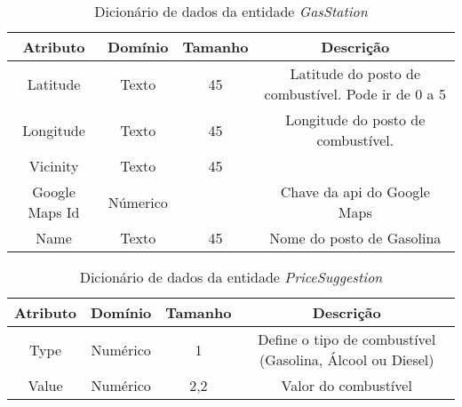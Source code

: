 \begin{table}[]
\centering
\caption{Dicionário de dados da entidade \textit{GasStation}}
\label{my-label}
\begin{tabular}{cccc}
\toprule
\textbf{Atributo} & \textbf{Domínio} & \textbf{Tamanho} & \textbf{Descrição} \\
\midrule
Latitude                        & Texto                          & 45                             & Latitude do posto de combustível. Pode ir de 0 a 5                 \\
Longitude                       & Texto                          & 45                             & Longitude do posto de combustível.\\
Vicinity                        & Texto                          & 45                             &                                  \\
Google Maps Id                  & Númerico                       &                                & Chave da api do Google Maps      \\
Name                            & Texto                          & 45                             & Nome do posto de Gasolina\\
\bottomrule
\end{tabular}
\end{table}

\begin{table}[]
\centering
\caption{Dicionário de dados da entidade \textit{PriceSuggestion}}
\label{dic:pricesuggestion}
\begin{tabular}{cccc}
\toprule
\textbf{Atributo} & \textbf{Domínio} & \textbf{Tamanho} & \textbf{Descrição} \\
\midrule
Type                            & Numérico                       &1                               & Define o tipo de combustível (Gasolina, Álcool ou Diesel)\\
Value                           & Numérico                       &2,2                             & Valor do combustível\\
\bottomrule
\end{tabular}
\end{table}

